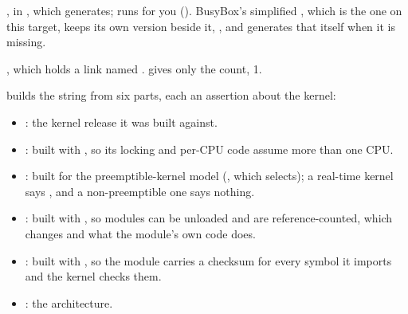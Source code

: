  , in , which  generates;
 runs  for you (). BusyBox's simplified
, which is the one on this target, keeps its own version beside it,
, and generates that itself when it is missing.

 , which holds a link named .
 gives only the count, 1.


  builds the string from six parts, each an assertion about
the kernel:
\begin{itemize}
  \item {}: the kernel release it was built against.
  \item {}: built with , so its locking and per-CPU code assume more than
    one CPU.
  \item {}: built for the preemptible-kernel model (, which
     selects); a real-time kernel says , and a
    non-preemptible one says nothing.
  \item {}: built with , so modules can be unloaded and
    are reference-counted, which changes  and what the module's own code does.
  \item {}: built with , so the module carries a checksum
    for every symbol it imports and the kernel checks them.
  \item {}: the architecture.
\end{itemize}

